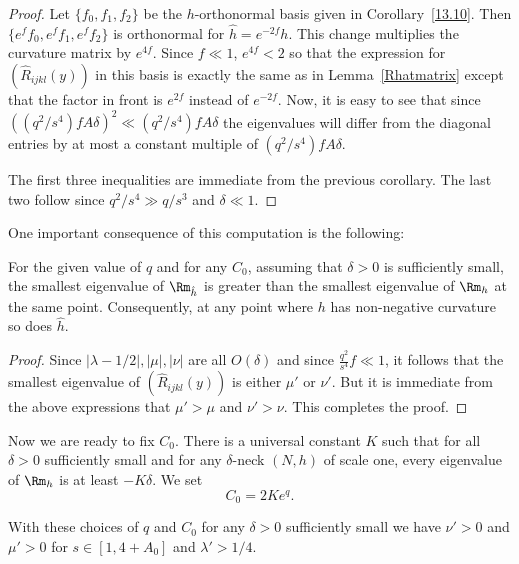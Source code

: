 \begin{proof}
Let $\{f_0,f_1,f_2\}$ be the $h$-orthonormal basis given in
Corollary~\ref{13.10}. Then $\{e^ff_0,e^ff_1,e^ff_2\}$ is orthonormal for $\hat
h=e^{-2f}h$. This change multiplies the curvature matrix by $e^{4f}$. Since
$f\ll 1$, $e^{4f}<2$ so that the expression for $(\hat R_{ijkl}(y))$ in this
basis is exactly the same as in Lemma~\ref{Rhatmatrix} except that the factor
in front is $e^{2f}$ instead of $e^{-2f}$. Now, it is easy to see that since
$((q^2/s^4)fA\delta)^2\ll (q^2/s^4)fA\delta$ the eigenvalues will differ from
the diagonal entries by at most a constant multiple of $(q^2/s^4)fA\delta$.


 The first three inequalities are  immediate
from the previous corollary. The last two follow since $q^2/s^4\gg q/s^3$ and
$\delta\ll 1$.
\end{proof}




One important consequence of this computation is the following:





\begin{corollary}
\label{cor:smallest-eigenvalue-increases}
\label{smeigen}
For the given value of $q$ and for any $C_0$,
assuming that $\delta>0$ is sufficiently small, the smallest
eigenvalue of $\Rm_{\hat h}$ is greater than the smallest eigenvalue
of $\Rm_h$ at the same point. Consequently, at any point where $h$
has non-negative curvature  so does $\hat h$.
\end{corollary}

\begin{proof}
Since $|\lambda-1/2|, |\mu|, |\nu|$ are all $O(\delta)$ and since
$\frac{q^2}{s^4}f\ll 1$, it follows that the smallest eigenvalue of $(\hat
R_{ijkl}(y))$ is either $\mu'$ or $\nu'$. But it is immediate from the above
expressions  that $\mu'>\mu$ and $\nu'>\nu$. This completes the proof.
\end{proof}


Now we are ready to fix $C_0$.
There is a universal constant $K$ such that for all $\delta>0$ sufficiently small
and for any $\delta$-neck $(N,h)$ of
scale one, every eigenvalue of $\Rm_h$ is at least $-K\delta$.
We set
$$C_0=2Ke^{q}.$$

\begin{lemma}
\label{lem:positive-eigenvalues-surgery-region}
\label{nuprime>0}
With these choices of $q$ and $C_0$ for any $\delta>0$ sufficiently small we have
$\nu'>0$ and $\mu'>0$ for $s\in [1,4+A_0]$ and $\lambda'>1/4$.
\end{lemma}


